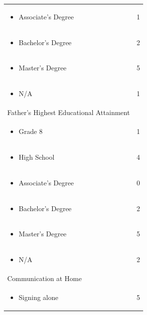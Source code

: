 \documentclass[11.5pt]{sig-alternate} %
\begin{document}
\begin{large}
\begin{table}[htbp]
\begin{tabular}{|l|c|}
\begin{itemize}[noitemsep, topsep=0pt] \item Associate’s Degree \end{itemize} & 1 \\
\begin{itemize}[noitemsep, topsep=0pt] \item Bachelor’s Degree \end{itemize} & 2 \\
\begin{itemize}[noitemsep, topsep=0pt] \item Master’s Degree \end{itemize} & 5 \\
\begin{itemize}[noitemsep, topsep=0pt] \item N/A \end{itemize} & 1 \\ \hline
Father's Highest Educational Attainment & \\
\begin{itemize}[noitemsep, topsep=0pt] \item Grade 8 \end{itemize} & 1 \\
\begin{itemize}[noitemsep, topsep=0pt] \item High School \end{itemize} & 4 \\
\begin{itemize}[noitemsep, topsep=0pt] \item Associate's Degree \end{itemize} & 0 \\
\begin{itemize}[noitemsep, topsep=0pt] \item Bachelor's Degree \end{itemize} & 2 \\
\begin{itemize}[noitemsep, topsep=0pt] \item Master's Degree \end{itemize} & 5 \\
\begin{itemize}[noitemsep, topsep=0pt] \item N/A \end{itemize} & 2 \\ \hline
Communication at Home & \\
\begin{itemize}[noitemsep, topsep=0pt] \item Signing alone \end{itemize} & 5 \\

\end{tabular}
\end{table}
\end{large}
\end{document}
